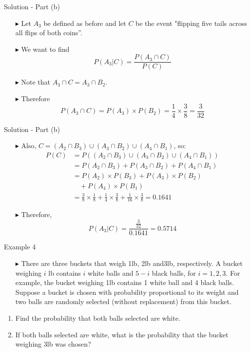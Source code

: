 \documentclass[12pt]{beamer}
\begin{document}
\begin{frame}{Solution - Part (b)}
\begin{itemize}
	\item[\color{blue}$\blacktriangleright$] Let $A_3$ be defined as before and let $C$ be the event "flipping five tails across all flips of both coins''.
	\item[\color{blue}$\blacktriangleright$] We want to find
	\[P(A_3|C) = \frac{P(A_3 \cap C)}{P(C)}\]
	\item[\color{blue}$\blacktriangleright$] Note that $A_3 \cap C = A_3 \cap B_2$.
	\item[\color{blue}$\blacktriangleright$] Therefore
	\[P(A_3 \cap C) = P(A_3) \times P(B_2) = \frac{1}{4} \times \frac{3}{8} = \frac{3}{32}\]
\end{itemize}
	
\end{frame}
\begin{frame}{Solution - Part (b)}
\begin{itemize}
	\item[\color{blue}$\blacktriangleright$] Also, $C = (A_2 \cap B_3) \cup (A_3 \cap B_2) \cup (A_4 \cap B_1)$, so:
	\begin{align*}
		P(C) &= P((A_2 \cap B_3) \cup (A_3 \cap B_2) \cup (A_4 \cap B_1)) \\
		&= P(A_2 \cap B_3) + P(A_3 \cap B_2) + P(A_4 \cap B_1) \\
		&= P(A_2) \times P(B_3) + P(A_3) \times P(B_2) \\
		&\quad + P(A_4) \times P(B_1) \\
		&= \frac{3}{8} \times \frac{1}{8} + \frac{1}{4} \times \frac{3}{8} + \frac{1}{16} \times \frac{3}{8} = 0.1641
	\end{align*}
	
	\item[\color{blue}$\blacktriangleright$] Therefore,
	\[P(A_3|C) = \frac{\frac{3}{32}}{0.1641} = 0.5714\]
\end{itemize}
\end{frame}
\begin{frame}{Example 4}
	\begin{itemize}
		\item[\color{blue}$\blacktriangleright$] There are three buckets that weigh 1lb, 2lb and3lb, respectively. A bucket weighing $i$ lb contains $i$ white balls and $5 - i$ black balls, for $i = 1,2,3$. For example, the bucket weighing 1lb contains 1 white ball and 4 black balls. Suppose a bucket is chosen with probability proportional to its weight and two balls are randomly selected (without replacement) from this bucket.
	\end{itemize}
	\begin{enumerate}[label=\textcolor{blue}{(\alph*)}]
		\item Find the probability that both balls selected are white.
		\item If both balls selected are white, what is the probability that the bucket weighing 3lb was chosen?
	\end{enumerate}
	
\end{frame}
\end{document}
